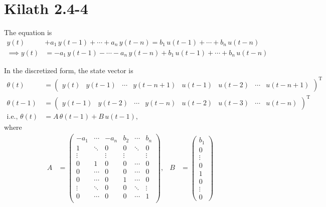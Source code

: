 \section{Kilath 2.4-4}
The equation is 
\begin{align*}
    y(t) &+ a_1\,y(t-1) + \cdots + a_n\,y(t-n) = b_1\,u(t-1) + \cdots + b_n\,u(t-n) \\
    \implies y(t) &= -a_1\,y(t-1) - \cdots - a_n\,y(t-n) + b_1\,u(t-1) + \cdots + b_n\,u(t-n) 
\end{align*}

In the discretized form, the state vector is
\begin{align*}
    \theta(t) &= \begin{pmatrix}
        y(t) & y(t-1) & \cdots & y(t-n+1) & u(t-1) & u(t-2) & \cdots & u(t-n+1)
    \end{pmatrix}^\text{T} \\
    \theta(t-1) &= \begin{pmatrix}
        y(t-1) & y(t-2) & \cdots & y(t-n) & u(t-2) & u(t-3) & \cdots & u(t-n)
    \end{pmatrix}^\text{T} \\
    \text{i.e., } \theta(t) &= A\,\theta(t-1) + B\,u(t-1),
\end{align*}
where
\begin{align*}
    A &= \begin{pmatrix}
        -a_1 & \cdots & -a_n & b_2 & \cdots & b_n \\
        1 & \ddots & 0 & 0 & \ddots & 0 \\
        \vdots & & \vdots & \vdots & & \vdots \\ 
        0 & 1 & 0 & 0 & \cdots & 0 \\
        0 & \cdots & 0 & 0 & \cdots & 0 \\
        0 & \cdots & 0 & 1 & \cdots & 0 \\
        \vdots & \ddots & 0 & 0 & \ddots & \vdots \\
        0 & \cdots & 0 & 0 & \cdots & 1 \\
    \end{pmatrix}, & B &= \begin{pmatrix}
        b_1 \\
        0 \\
        \vdots\\ 
        0 \\
        1 \\
        0 \\
        \vdots \\
        0
    \end{pmatrix}
\end{align*}